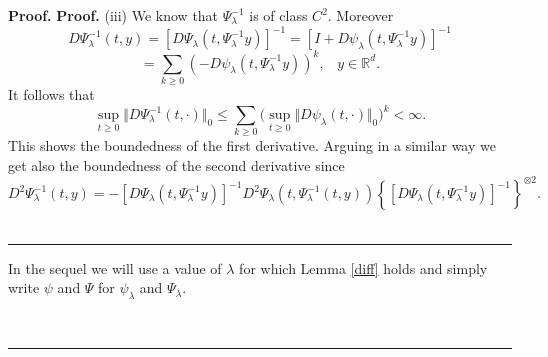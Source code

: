 \documentclass[a4paper,10pt]{article}
\newenvironment{proof}[1][Proof]{\textbf{#1.} }{\ \rule{0.5em}{0.5em}}
\begin{document}
\begin{proof}
\begin{proof}
\vskip 2mm (iii) We know that $ \Psi_{\lambda}^{-1} $ is of class
$C^2$. Moreover
$$
D \Psi_{\lambda}^{-1}(t,y) = [D\Psi_{\lambda}(t,
\Psi_{\lambda}^{-1} y)]^{-1} = [I + D\psi_{\lambda}(t,
\Psi_{\lambda}^{-1} y)]^{-1}
$$
$$
= \sum_{k \ge 0} (- D\psi_{\lambda}(t, \Psi_{\lambda}^{-1}
y))^k,\;\;\; y \in \mathbb{R} ^d.
$$
It follows that
$$ \sup_{t\geq0}\Vert D \Psi_{\lambda}^{-1}(t, \cdot)
  \Vert_{0} \le \sum_{k \ge 0} \big (\sup_{t\geq0}
   \Vert D\psi_{\lambda}(t, \cdot )
     \Vert_{0} \big )^k < \infty.
$$
 This shows the boundedness of the first derivative.
 Arguing in a similar way we get also the
 boundedness of the second derivative since
 $$
 D^2 \Psi_\lambda^{-1}(t,y) =  -  [D\Psi_{\lambda}(t,
\Psi_{\lambda}^{-1} y)]^{-1} D^2  \Psi_{\lambda}(t, \Psi_{\lambda}^{-1}(t,y)) \left\{ [D\Psi_{\lambda}(t,
\Psi_{\lambda}^{-1} y)]^{-1} \right\}^{\otimes 2} .
 $$
\end{proof}

\vskip 2mm
 In the sequel we will use a value of $\lambda$ for which Lemma \ref{diff} holds
 and simply write $\psi$ and $\Psi$ for $\psi_{\lambda}$ and
$\Psi_{\lambda}$.


\end{proof}
\end{document}
